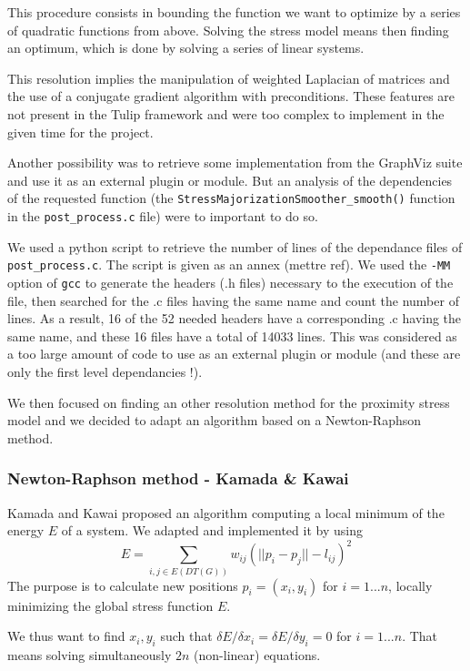 \documentclass[12pt]{report}
\begin{document}
This procedure consists in bounding the function we want to optimize by a series of quadratic functions from above. Solving the stress model means then finding an optimum, which is done by solving a series of linear systems.

\bigskip
This resolution implies the manipulation of weighted Laplacian of matrices and the use of a conjugate gradient algorithm with preconditions. These features are not present in the Tulip framework and were too complex to implement in the given time for the project. 

\bigskip
Another possibility was to retrieve some implementation from the GraphViz suite and use it as an external plugin or module. 
But an analysis of the dependencies of the requested function (the \texttt{StressMajorizationSmoother\_smooth()} function in the \texttt{post\_process.c} file) were to important to do so.

We used a python script to retrieve the number of lines of the dependance files of \texttt{post\_process.c}. The script is given as an annex (mettre ref). We used the \texttt{-MM} option of \texttt{gcc} to generate the headers (.h files) necessary to the execution of the file, then searched for the .c files having the same name and count the number of lines. As a result, 16 of the 52 needed headers have a corresponding .c having the same name, and these 16 files have a total of 14033 lines.
This was considered as a too large amount of code to use as an external plugin or module (and these are only the first level dependancies !).

\bigskip
We then focused on finding an other resolution method for the proximity stress model and we decided to adapt an algorithm based on a Newton-Raphson method.

\subsubsection{Newton-Raphson method - Kamada \& Kawai}

Kamada and Kawai \cite{Kamada89} proposed an algorithm computing a local minimum of the energy $E$ of a system. We adapted and implemented it by using 
\[ E = \sum_{i,j \in E(DT(G))} w_{ij}(||p_i - p_j|| - l_{ij})^2 \]
The purpose is to calculate new positions $p_i = (x_i, y_i)$ for $i = 1... n$, locally minimizing the global stress function $E$. 

We thus want to find $x_i, y_i$ such that $\delta E / \delta x_i = \delta E / \delta y_i = 0$ for $i = 1... n$. That means solving simultaneously $2n$ (non-linear) equations.
\end{document}

